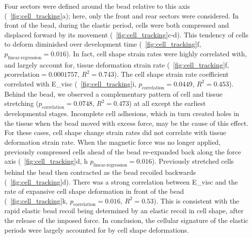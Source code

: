 Four sectors were defined around the bead relative to this axis (\figurename~\ref{fig:cell_tracking}a); here, only the front and rear sectors were considered.
In front of the bead, during the elastic period, cells were both compressed and displaced forward by its movement (\figurename~\ref{fig:cell_tracking}c-d).
This tendency of cells to deform diminished over development time (\figurename~\ref{fig:cell_tracking}f, \(p_\text{linear-regression} = 0.016\)). %
In fact, cell shape strain rates were highly correlated with, and largely account for, tissue deformation strain rate (\figurename~\ref{fig:cell_tracking}f,	\(p\text{correlation} = 0.0001757\), \(R^2 = 0.743\)).
The cell shape strain rate coefficient correlated with \gls{E_visc} (\figurename~\ref{fig:cell_tracking}i, \(p_\text{correlation} = 0.0449\), \(R^2 = 0.453\)).
Behind the bead, we observed a complementary pattern of cell and tissue stretching (\(p_\text{correlation} = 0.0748\), \(R^2 = 0.473\)) at all except the earliest developmental stages.
Incomplete cell adhesions, which in turn created holes in the tissue when the bead moved with excess force, may be the cause of this effect.
For these cases, cell shape change strain rates did not correlate with tissue deformation strain rate.
When the magnetic force was no longer applied, previously compressed cells ahead of the bead re-expanded back along the force axis (\figurename~\ref{fig:cell_tracking}d, h \(p_\text{linear-regression} = 0.016\)). %
Previously stretched cells behind the bead then contracted as the bead recoiled backwards (\figurename~\ref{fig:cell_tracking}d).
There was a strong correlation between \gls{E_visc} and the rate of expansive cell shape deformation in front of the bead (\figurename~\ref{fig:cell_tracking}k, \(p_\text{correlation} = 0.016\), \(R^2 = 0.53\)).
This is consistent with the rapid elastic bead recoil being determined by an elastic recoil in cell shape, after the release of the imposed force.
In conclusion, the cellular signature of the elastic periods were largely accounted for by cell shape deformations.


